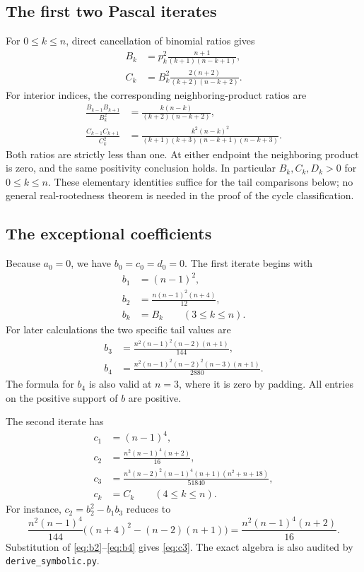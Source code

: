 \documentclass[11pt,a4paper]{article}
\theoremstyle{definition}
\begin{document}
\subsection{The first two Pascal iterates}
For $0\le k\le n$, direct cancellation of binomial ratios gives
\begin{align}
 B_k&=p_k^2\frac{n+1}{(k+1)(n-k+1)},\label{eq:B}\\
 C_k&=B_k^2\frac{2(n+2)}{(k+2)(n-k+2)}.\label{eq:C}
\end{align}
For interior indices, the corresponding neighboring-product ratios are
\begin{align}
 \frac{B_{k-1}B_{k+1}}{B_k^2}
   &=\frac{k(n-k)}{(k+2)(n-k+2)},\label{eq:B-ratio}\\
 \frac{C_{k-1}C_{k+1}}{C_k^2}
   &=\frac{k^2(n-k)^2}
    {(k+1)(k+3)(n-k+1)(n-k+3)}.\label{eq:C-ratio}
\end{align}
Both ratios are strictly less than one. At either endpoint the
neighboring product is zero, and the same positivity conclusion holds.
In particular $B_k,C_k,D_k>0$ for $0\le k\le n$. These elementary
identities suffice for the tail comparisons below; no general
real-rootedness theorem is needed in the proof of the cycle classification.

\subsection{The exceptional coefficients}
Because $a_0=0$, we have $b_0=c_0=d_0=0$. The first iterate begins with
\begin{align}
 b_1&=(n-1)^2,\label{eq:b1}\\
 b_2&=\frac{n(n-1)^2(n+4)}{12},\label{eq:b2}\\
 b_k&=B_k\qquad(3\le k\le n).\label{eq:b-tail}
\end{align}
For later calculations the two specific tail values are
\begin{align}
 b_3&=\frac{n^2(n-1)^2(n-2)(n+1)}{144},\label{eq:b3}\\
 b_4&=\frac{n^2(n-1)^2(n-2)^2(n-3)(n+1)}{2880}.
 \label{eq:b4}
\end{align}
The formula for $b_4$ is also valid at $n=3$, where it is zero by padding.
All entries on the positive support of $b$ are positive.

The second iterate has
\begin{align}
 c_1&=(n-1)^4,\label{eq:c1}\\
 c_2&=\frac{n^2(n-1)^4(n+2)}{16},\label{eq:c2}\\
 c_3&=\frac{n^3(n-2)^2(n-1)^4(n+1)(n^2+n+18)}{51840},
       \label{eq:c3}\\
 c_k&=C_k\qquad(4\le k\le n).\label{eq:c-tail}
\end{align}
For instance, $c_2=b_2^2-b_1b_3$ reduces to
\[
 \frac{n^2(n-1)^4}{144}
       \bigl((n+4)^2-(n-2)(n+1)\bigr)
 =\frac{n^2(n-1)^4(n+2)}{16}.
\]
Substitution of \eqref{eq:b2}--\eqref{eq:b4} gives \eqref{eq:c3}.
The exact algebra is also audited by \texttt{derive\_symbolic.py}.
\end{document}
